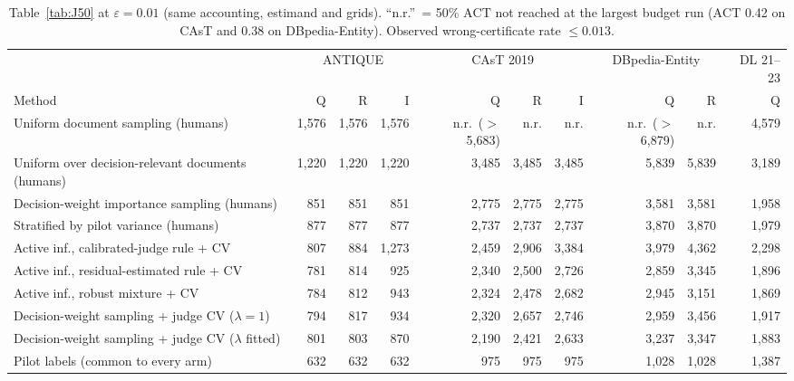 \documentclass{article}
\newcommand{\eps}{\varepsilon}
\newcommand{\ACT}{\mathrm{ACT}}
\begin{document}
\begin{table}[h]\centering\scriptsize\setlength{\tabcolsep}{3pt}
\caption{Table~\ref{tab:J50} at $\eps=0.01$ (same accounting, estimand and grids). ``n.r.''\ = 50\% $\ACT$ not reached at the largest budget run ($\ACT$ 0.42 on CAsT and 0.38 on DBpedia-Entity). Observed wrong-certificate rate $\le0.013$.}\label{tab:J50b}
\begin{tabular}{l rrr rrr rr r}\toprule
 & \multicolumn{3}{c}{ANTIQUE} & \multicolumn{3}{c}{CAsT 2019} & \multicolumn{2}{c}{DBpedia-Entity} & DL 21--23\\
Method & Q & R & I & Q & R & I & Q & R & Q\\\midrule
Uniform document sampling (humans) & 1,576 & 1,576 & 1,576 & n.r.\ ($>$5,683) & n.r. & n.r. & n.r.\ ($>$6,879) & n.r. & 4,579\\
Uniform over decision-relevant documents (humans) & 1,220 & 1,220 & 1,220 & 3,485 & 3,485 & 3,485 & 5,839 & 5,839 & 3,189\\
Decision-weight importance sampling (humans) & 851 & 851 & 851 & 2,775 & 2,775 & 2,775 & 3,581 & 3,581 & 1,958\\
Stratified by pilot variance (humans) & 877 & 877 & 877 & 2,737 & 2,737 & 2,737 & 3,870 & 3,870 & 1,979\\
Active inf., calibrated-judge rule + CV & 807 & 884 & 1,273 & 2,459 & 2,906 & 3,384 & 3,979 & 4,362 & 2,298\\
Active inf., residual-estimated rule + CV & 781 & 814 & 925 & 2,340 & 2,500 & 2,726 & 2,859 & 3,345 & 1,896\\
Active inf., robust mixture + CV & 784 & 812 & 943 & 2,324 & 2,478 & 2,682 & 2,945 & 3,151 & 1,869\\
Decision-weight sampling + judge CV ($\lambda=1$) & 794 & 817 & 934 & 2,320 & 2,657 & 2,746 & 2,959 & 3,456 & 1,917\\
Decision-weight sampling + judge CV ($\lambda$ fitted) & 801 & 803 & 870 & 2,190 & 2,421 & 2,633 & 3,237 & 3,347 & 1,883\\\midrule
Pilot labels (common to every arm) & 632 & 632 & 632 & 975 & 975 & 975 & 1,028 & 1,028 & 1,387\\\bottomrule
\end{tabular}
\end{table}
\end{document}
